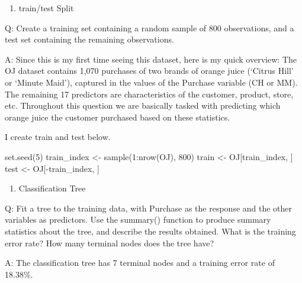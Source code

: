\documentclass[
]{book}
\newenvironment{Shaded}{\begin{snugshade}}{\end{snugshade}}
\newcommand{\DecValTok}[1]{\textcolor[rgb]{0.00,0.00,0.81}{#1}}
\newcommand{\FunctionTok}[1]{\textcolor[rgb]{0.00,0.00,0.00}{#1}}
\newcommand{\NormalTok}[1]{#1}
\newcommand{\OtherTok}[1]{\textcolor[rgb]{0.56,0.35,0.01}{#1}}
\newcommand{\SpecialCharTok}[1]{\textcolor[rgb]{0.00,0.00,0.00}{#1}}
\providecommand{\tightlist}{%
  \setlength{\itemsep}{0pt}\setlength{\parskip}{0pt}}
\begin{document}
\begin{enumerate}
\def\labelenumi{(\alph{enumi})}
\tightlist
\item
  train/test Split
\end{enumerate}

Q: Create a training set containing a random sample of 800 observations, and a test set containing the remaining observations.

A: Since this is my first time seeing this dataset, here is my quick overview: The OJ dataset contains 1,070 purchases of two brands of orange juice (`Citrus Hill' or `Minute Maid'), captured in the values of the Purchase variable (CH or MM). The remaining 17 predictors are characteristics of the customer, product, store, etc. Throughout this question we are basically tasked with predicting which orange juice the customer purchased based on these statistics.

I create train and test below.

\begin{Shaded}
\begin{Highlighting}[]
\FunctionTok{set.seed}\NormalTok{(}\DecValTok{5}\NormalTok{)}
\NormalTok{train\_index }\OtherTok{\textless{}{-}} \FunctionTok{sample}\NormalTok{(}\DecValTok{1}\SpecialCharTok{:}\FunctionTok{nrow}\NormalTok{(OJ), }\DecValTok{800}\NormalTok{)}
\NormalTok{train }\OtherTok{\textless{}{-}}\NormalTok{ OJ[train\_index, ]}
\NormalTok{test }\OtherTok{\textless{}{-}}\NormalTok{ OJ[}\SpecialCharTok{{-}}\NormalTok{train\_index, ]}
\end{Highlighting}
\end{Shaded}

\begin{enumerate}
\def\labelenumi{(\alph{enumi})}
\setcounter{enumi}{1}
\tightlist
\item
  Classification Tree
\end{enumerate}

Q: Fit a tree to the training data, with Purchase as the response and the other variables as predictors. Use the summary() function to produce summary statistics about the tree, and describe the results obtained. What is the training error rate? How many terminal nodes does the tree have?

A: The classification tree has 7 terminal nodes and a training error rate of 18.38\%.
\end{document}
